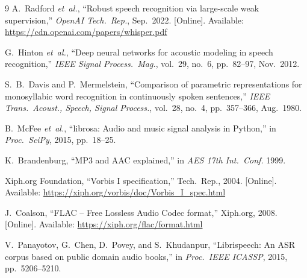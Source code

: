 \documentclass[conference]{IEEEtran}
\begin{document}
\begin{thebibliography}{9}
A.~Radford \emph{et~al.}, ``Robust speech recognition via large-scale
weak supervision,'' \emph{OpenAI Tech.\ Rep.}, Sep.\ 2022.
[Online]. Available: \url{https://cdn.openai.com/papers/whisper.pdf}

G.~Hinton \emph{et~al.}, ``Deep neural networks for acoustic modeling in
speech recognition,'' \emph{IEEE Signal Process.\ Mag.}, vol.~29,
no.~6, pp.~82--97, Nov.\ 2012.

S.~B.~Davis and P.~Mermelstein, ``Comparison of parametric
representations for monosyllabic word recognition in continuously
spoken sentences,'' \emph{IEEE Trans.\ Acoust., Speech, Signal
Process.}, vol.~28, no.~4, pp.~357--366, Aug.\ 1980.

B.~McFee \emph{et~al.}, ``librosa: Audio and music signal analysis in
Python,'' in \emph{Proc.\ SciPy}, 2015, pp.~18--25.

K.~Brandenburg, ``MP3 and AAC explained,'' in \emph{AES 17th Int.\ Conf.}
1999.

Xiph.org Foundation, ``Vorbis I specification,'' Tech.\ Rep., 2004.
[Online]. Available: \url{https://xiph.org/vorbis/doc/Vorbis_I_spec.html}

J.~Coalson, ``FLAC -- Free Lossless Audio Codec format,'' Xiph.org,
2008. [Online]. Available: \url{https://xiph.org/flac/format.html}

V.~Panayotov, G.~Chen, D.~Povey, and S.~Khudanpur, ``Librispeech: An
ASR corpus based on public domain audio books,'' in \emph{Proc.\ IEEE
ICASSP}, 2015, pp.~5206--5210.
\end{thebibliography}
\end{document}
